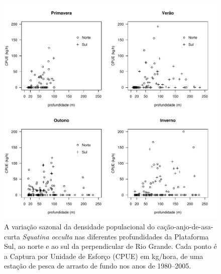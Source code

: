 \documentclass[a4paper,11pt,twoside,showtrims,onecolumn,openright,final]{memoir}
\begin{document}
\begin{figure}
\begin{center}
\includegraphics[width=\textwidth]{OCCULTA_CPUEXPROFTRIMESTRES}
\end{center}
\caption[Variação sazonal da densidade populacional do cação-anjo-de-asa-curta \emph{Squatina occulta}]
	{A variação sazonal da densidade populacional do cação-anjo-de-asa-curta \emph{Squatina occulta} 
	 nas diferentes profundidades da Plataforma Sul, ao norte e ao sul da perpendicular de Rio Grande. 
	 Cada ponto é a Captura por Unidade de Esforço (CPUE) em kg/hora, de uma 
	 estação de pesca de arrasto de fundo nos anos de  1980--2005.}
\label{fig:occulta-cpueportrimestre}
\end{figure}


%
%
\end{document}
